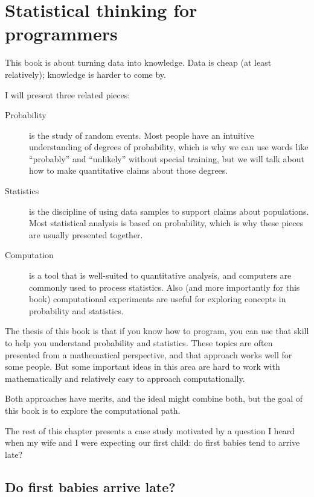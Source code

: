 \documentclass[10pt]{book}
\begin{document}
\mainmatter


\chapter{Statistical thinking for programmers}

This book is about turning data into knowledge.  Data is cheap (at
least relatively); knowledge is harder to come by.

I will present three related pieces:

\begin{description}

\item[Probability] is the study of random events.  Most people have an
  intuitive understanding of degrees of probability, which is why we
  can use words like ``probably'' and ``unlikely'' without special
  training, but we will talk about how to make quantitative claims
  about those degrees.

\item[Statistics] is the discipline of using data samples to support
  claims about populations.  Most statistical analysis is based on
  probability, which is why these pieces are usually presented
  together.

\item[Computation] is a tool that is well-suited to quantitative
  analysis, and computers are commonly used to process statistics.
  Also (and more importantly for this book) computational experiments
  are useful for exploring concepts in probability and statistics.

\end{description}

The thesis of this book is that if you know how to program, you can
use that skill to help you understand probability and statistics.
These topics are often presented from a mathematical perspective, and
that approach works well for some people.  But some important ideas
in this area are hard to work with mathematically and relatively
easy to approach computationally.

Both approaches have merits, and the ideal might combine both, but
the goal of this book is to explore the computational path.

The rest of this chapter presents a case study motivated by a question
I heard when my wife and I were expecting our first child: do first
babies tend to arrive late?

\section{Do first babies arrive late?}
\end{document}
